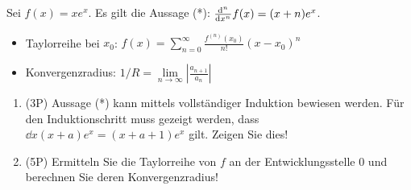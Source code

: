 Sei $f(x)=xe^x$. Es gilt die Aussage (*): $\frac{\mathrm{d}^{n}{}}{\mathrm{d}{x^{n}}} f(x) = (x+n)e^x$.
\begin{itemize}
	\item Taylorreihe bei $x_0$: $f(x) = \sum\limits_{n=0}^{\infty} \frac{f^{(n)}(x_0)}{n!} (x-x_0)^n$
	\item Konvergenzradius: $1/R = \lim\limits_{n\to\infty} \left|\frac{a_{n+1}}{a_n}\right|$
\end{itemize}
\begin{enumerate}[label=(\alph*)]
	
	\item (3P) Aussage (*) kann mittels vollständiger Induktion bewiesen werden. Für den Induktionschritt muss gezeigt werden, dass $\dd{}{x} (x+a)e^x = (x+a+1)e^x$ gilt. Zeigen Sie dies!
	
		\bigskip
		\bigskip
		\bigskip
		\bigskip
		\bigskip
		\bigskip
		\bigskip
		\bigskip
		\bigskip
		\bigskip
		\bigskip
		
	\item (5P) Ermitteln Sie die Taylorreihe von $f$ an der Entwicklungsstelle $0$ und berechnen Sie deren Konvergenzradius!
		
\end{enumerate}
